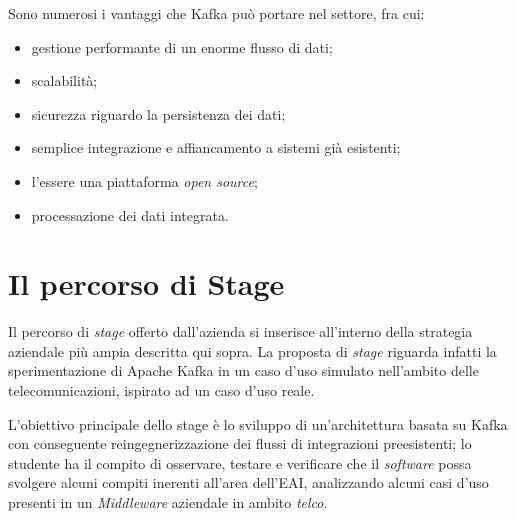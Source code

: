 \bigskip\noindent
Sono numerosi i vantaggi che Kafka può portare nel settore, fra cui:
\begin{itemize}
  \item gestione performante di un enorme flusso di dati;
  \item scalabilità;
  \item sicurezza riguardo la persistenza dei dati;
  \item semplice integrazione e affiancamento a sistemi già esistenti;
  \item l'essere una piattaforma \textit{open source};
  \item processazione dei dati integrata.
\end{itemize}


%

\section{Il percorso di Stage}

%
%

Il percorso di \textit{stage} offerto dall'azienda si inserisce all'interno della strategia aziendale più ampia descritta qui sopra.
La proposta di \textit{stage} riguarda infatti la sperimentazione di Apache Kafka in un caso d'uso simulato nell'ambito delle telecomunicazioni, ispirato ad un caso d'uso reale.

L'obiettivo principale dello stage è lo sviluppo di un'architettura basata su Kafka con conseguente reingegnerizzazione dei flussi di integrazioni preesistenti; lo studente ha il compito di osservare, testare e verificare che il \textit{software} possa svolgere alcuni compiti inerenti all'area dell'EAI, analizzando alcuni casi d'uso presenti in un \textit{Middleware} aziendale in ambito \textit{telco}.

